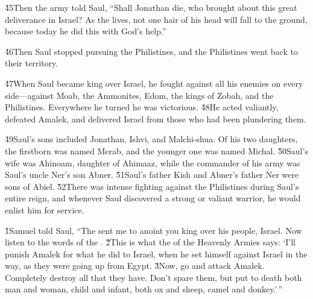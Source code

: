 \v{45}Then the army told Saul, ``Shall Jonathan die, who brought about this great deliverance in Israel? As the  lives, not one hair of his head will fall to the ground, because today he did this with God's help.''

\v{46}Then Saul stopped pursuing the Philistines, and the Philistines went back to their territory.

\v{47}When Saul became king over Israel, he fought against all his enemies on every side---against Moab, the Ammonites, Edom, the kings of Zobah, and the Philistines. Everywhere he turned he was victorious. \v{48}He acted valiantly, defeated Amalek, and delivered Israel from those who had been plundering them.

\v{49}Saul's sons included Jonathan, Ishvi, and Malchi-shua. Of his two daughters, the firstborn was named Merab, and the younger one was named Michal. \v{50}Saul's wife was Ahinoam, daughter of Ahimaaz, while the commander of his army was Saul's uncle Ner's son Abner. \v{51}Saul's father Kish and Abner's father Ner were sons of Abiel. \v{52}There was intense fighting against the Philistines during Saul's entire reign, and whenever Saul discovered a strong or valiant warrior, he would enlist him for service.

\v{1}Samuel told Saul, ``The  sent me to anoint you king over his people, Israel. Now listen to the words of the . \v{2}This is what the  of the Heavenly Armies says: `I'll punish Amalek for what he did to Israel, when he set himself against Israel in the way, as they were going up from Egypt. \v{3}Now, go and attack Amalek. Completely destroy all that they have. Don't spare them, but put to death both man and woman, child and infant, both ox and sheep, camel and donkey.'\,''

